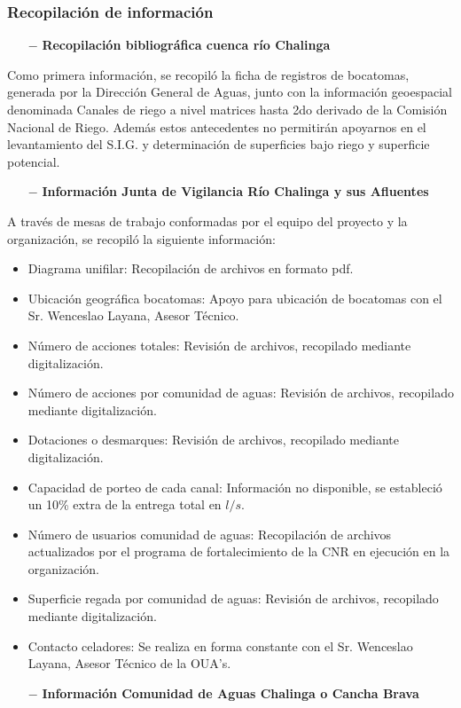 \documentclass[]{article}
\begin{document}
\subsubsection{Recopilación de información}

\begin{itemize}
	\item[$-$] \textbf{Recopilación bibliográfica cuenca río Chalinga}
\end{itemize}

Como primera información, se recopiló la ficha de registros de bocatomas, generada por la Dirección General de Aguas, junto con la información geoespacial denominada Canales de riego a nivel matrices hasta 2do derivado de la Comisión Nacional de Riego. Además estos antecedentes no permitirán apoyarnos en el levantamiento del S.I.G. y determinación de superficies bajo riego y superficie potencial.

\begin{itemize}
	\item[$-$] \textbf{Información Junta de Vigilancia Río Chalinga y sus Afluentes}
\end{itemize}

A través de mesas de trabajo conformadas por el equipo del proyecto y la organización, se recopiló la siguiente información:

\begin{itemize}	
	\item Diagrama unifilar: Recopilación de archivos en formato pdf.
	\item Ubicación geográfica bocatomas: Apoyo para ubicación de bocatomas con el Sr. Wenceslao Layana, Asesor Técnico.
	\item Número de acciones totales: Revisión de archivos, recopilado mediante digitalización.
	\item Número de acciones por comunidad de aguas: Revisión de archivos, recopilado mediante digitalización.
	\item Dotaciones o desmarques: Revisión de archivos, recopilado mediante digitalización.
	\item Capacidad de porteo de cada canal: Información no disponible, se estableció un 10\% extra de la entrega total en $l/s$.
	\item Número de usuarios comunidad de aguas: Recopilación de archivos actualizados por el programa de fortalecimiento de la CNR en ejecución en la organización.
	\item Superficie regada por comunidad de aguas: Revisión de archivos, recopilado mediante digitalización.
	\item Contacto celadores: Se realiza en forma constante con el Sr. Wenceslao Layana, Asesor Técnico de la OUA's.
\end{itemize}
\clearpage
\begin{itemize}
	\item[$-$] \textbf{Información Comunidad de Aguas Chalinga o Cancha Brava}
\end{itemize}
\end{document}
